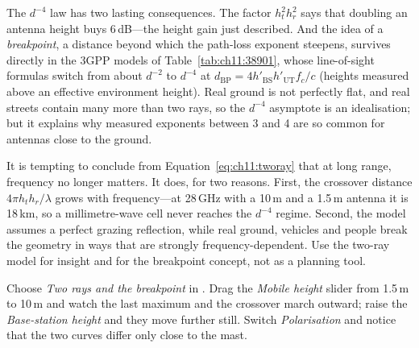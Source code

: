
The $d^{-4}$ law has two lasting consequences. The factor $h_t^2h_r^2$ says that doubling an
antenna height buys 6\,dB---the height gain just described. And the idea of a \emph{breakpoint},
a distance beyond which the path-loss exponent steepens, survives directly in the 3GPP models of
Table~\ref{tab:ch11:38901}, whose line-of-sight formulas switch from about $d^{-2}$ to $d^{-4}$ at
$d_{\text{BP}}=4h'_{\text{BS}}h'_{\text{UT}}f_c/c$ (heights measured above an effective environment
height). Real ground is not perfectly flat, and real streets contain many more than two rays, so
the $d^{-4}$ asymptote is an idealisation; but it explains why measured exponents between 3 and 4
are so common for antennas close to the ground.

\begin{pitfall}
It is tempting to conclude from Equation~\eqref{eq:ch11:tworay} that at long range, frequency no
longer matters. It does, for two reasons. First, the crossover distance $4\pi h_th_r/\lambda$ grows
with frequency---at 28\,GHz with a 10\,m and a 1.5\,m antenna it is 18\,km, so a millimetre-wave
cell never reaches the $d^{-4}$ regime. Second, the model assumes a perfect grazing reflection,
while real ground, vehicles and people break the geometry in ways that are strongly
frequency-dependent. Use the two-ray model for insight and for the breakpoint concept, not as
a planning tool.
\end{pitfall}

\begin{tryit}
Choose \emph{Two rays and the breakpoint} in . Drag the
\emph{Mobile height} slider from 1.5\,m to 10\,m and watch the last maximum and the crossover march
outward; raise the \emph{Base-station height} and they move further still. Switch \emph{Polarisation} and notice that the two
curves differ only close to the mast.
\end{tryit}

